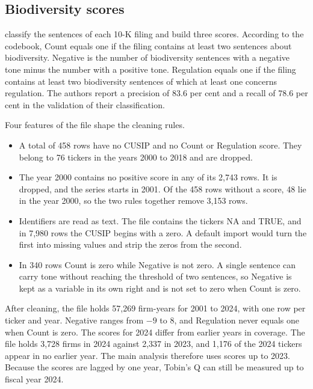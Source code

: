 \documentclass[12pt,a4paper]{article}
\begin{document}
\subsection{Biodiversity scores}

\citet{giglio2026} classify the sentences of each 10-K filing and build three scores. According to the codebook, Count equals one if the filing contains at least two sentences about biodiversity. Negative is the number of biodiversity sentences with a negative tone minus the number with a positive tone. Regulation equals one if the filing contains at least two biodiversity sentences of which at least one concerns regulation. The authors report a precision of 83.6 per cent and a recall of 78.6 per cent in the validation of their classification.

Four features of the file shape the cleaning rules.

\begin{itemize}
\item A total of 458 rows have no CUSIP and no Count or Regulation score. They belong to 76 tickers in the years 2000 to 2018 and are dropped.
\item The year 2000 contains no positive score in any of its 2,743 rows. It is dropped, and the series starts in 2001. Of the 458 rows without a score, 48 lie in the year 2000, so the two rules together remove 3,153 rows.
\item Identifiers are read as text. The file contains the tickers NA and TRUE, and in 7,980 rows the CUSIP begins with a zero. A default import would turn the first into missing values and strip the zeros from the second.
\item In 340 rows Count is zero while Negative is not zero. A single sentence can carry tone without reaching the threshold of two sentences, so Negative is kept as a variable in its own right and is not set to zero when Count is zero.
\end{itemize}

After cleaning, the file holds 57,269 firm-years for 2001 to 2024, with one row per ticker and year. Negative ranges from $-9$ to 8, and Regulation never equals one when Count is zero. The scores for 2024 differ from earlier years in coverage. The file holds 3,728 firms in 2024 against 2,337 in 2023, and 1,176 of the 2024 tickers appear in no earlier year. The main analysis therefore uses scores up to 2023. Because the scores are lagged by one year, Tobin's Q can still be measured up to fiscal year 2024.
\end{document}
